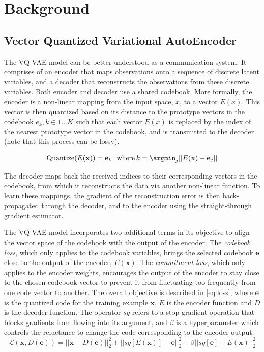 \section{Background}
\subsection{Vector Quantized Variational AutoEncoder} \label{sec:vq}
The VQ-VAE model \cite{VQVAE} can be better understood as a communication system. It comprises of an encoder that maps observations onto a sequence of discrete latent variables, and a decoder that reconstructs the observations from these discrete variables. Both encoder and decoder use a shared codebook. More formally, the encoder is a non-linear mapping from the input space, $x$, to a vector $E(x)$. This vector is then quantized based on its distance to the prototype vectors in the codebook $e_k, k \in 1 \ldots K$ such that each vector $E(x)$ is replaced by the index of the nearest prototype vector in the codebook, and is transmitted to the decoder (note that this process can be lossy).

\begin{equation}\label{eq:quantize}
    \text{Quantize}(E(\mathbf{x})) = \mathbf{e}_k \,\,\,\,\text{where}\, k = \argmin_j ||E(\mathbf{x}) - \mathbf{e}_j||
\end{equation}

\par
The decoder maps back the received indices to their corresponding vectors in the codebook, from which it reconstructs the data via another non-linear function. To learn these mappings, the gradient of the reconstruction error is then back-propagated through the decoder, and to the encoder using the straight-through gradient estimator. 

\par
The VQ-VAE model incorporates two additional terms in its objective to align the vector space of the codebook with the output of the encoder. The \emph{codebook loss}, which only applies to the codebook variables, brings the selected codebook $\mathbf{e}$ close to the output of the encoder,  $E(\mathbf{x})$. The \emph{commitment loss}, which only applies to the encoder weights, encourages the output of the encoder to stay close to the chosen codebook vector to prevent it from fluctuating too frequently from one code vector to another. The overall objective is described in \eqref{eq:loss}, where $\mathbf{e}$ is the quantized code for the training example $\mathbf{x}$, $E$ is the encoder function and $D$ is the decoder function. The operator $sg$ refers to a stop-gradient operation that blocks gradients from flowing into its argument, and $\beta$ is a hyperparameter which controls the reluctance to change the code corresponding to the encoder output.
\begin{equation}\label{eq:loss}
\mathcal{L}(\mathbf{x}, D(\mathbf{e}))  = ||\mathbf{x} - D(\mathbf{e})||_2^2 + ||sg[E(\mathbf{x})] - \mathbf{e}||_2^2 + \beta ||sg[\mathbf{e}] - E(\mathbf{x})||^2_2
\end{equation}

